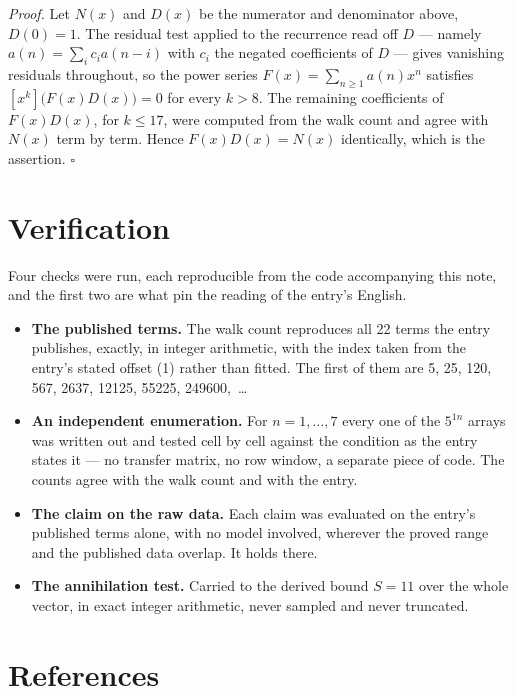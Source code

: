 \documentclass[11pt]{article}
\theoremstyle{definition}
\begin{document}
{\itshape Proof.} Let $N(x)$ and $D(x)$ be the numerator and denominator above, $D(0)=1$. The residual test applied to the recurrence read off $D$ --- namely $a(n) = \sum_i c_i a(n-i)$ with $c_i$ the negated coefficients of $D$ --- gives vanishing residuals throughout, so the power series $F(x)=\sum_{n\ge 1}a(n)x^n$ satisfies $[x^k]\bigl(F(x)D(x)\bigr) = 0$ for every $k > 8$. The remaining coefficients of $F(x)D(x)$, for $k \le 17$, were computed from the walk count and agree with $N(x)$ term by term. Hence $F(x)D(x) = N(x)$ identically, which is the assertion. $\square$

\section{Verification}

Four checks were run, each reproducible from the code accompanying this note, and the first two are what pin the reading of the entry's English.

\begin{itemize}

\item {\bfseries The published terms.} The walk count reproduces all 22 terms the entry publishes, exactly, in integer arithmetic, with the index taken from the entry's stated offset (1) rather than fitted. The first of them are 5, 25, 120, 567, 2637, 12125, 55225, 249600,~\dots

\item {\bfseries An independent enumeration.} For $n = 1,\dots,7$ every one of the $5^{1n}$ arrays was written out and tested cell by cell against the condition as the entry states it --- no transfer matrix, no row window, a separate piece of code. The counts agree with the walk count and with the entry.

\item {\bfseries The claim on the raw data.} Each claim was evaluated on the entry's published terms alone, with no model involved, wherever the proved range and the published data overlap. It holds there.

\item {\bfseries The annihilation test.} Carried to the derived bound $S = 11$ over the whole vector, in exact integer arithmetic, never sampled and never truncated.

\end{itemize}

\section{References}
\end{document}
